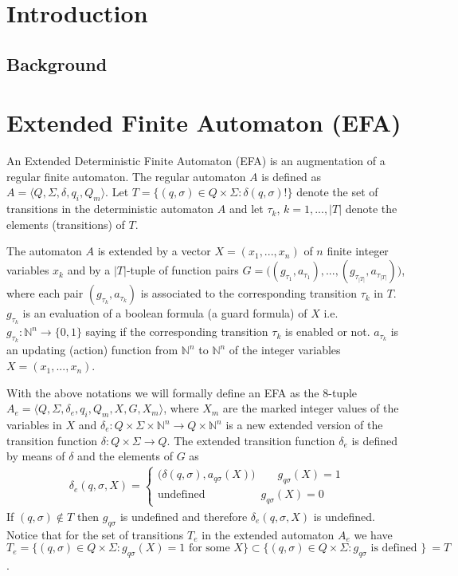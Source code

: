 \documentclass{article}
\begin{document}
\tableofcontents
\section{Introduction}

\subsection{Background}

\section{Extended Finite Automaton (EFA)}
An Extended Deterministic Finite Automaton (EFA) is an
augmentation of a regular finite automaton. The regular automaton
$A$ is defined as $A=\langle Q,\Sigma,\delta, q_i,Q_m \rangle$.
Let $T=\{(q,\sigma)\in Q \times \Sigma: \delta(q,\sigma)!\}$
denote the set of transitions in the deterministic automaton $A$
and let $\tau_k$, $k=1,...,|T|$ denote the elements (transitions)
of $T$.

The automaton $A$ is extended by a vector $X=(x_1,...,x_n)$ of $n$
finite integer variables $x_{k}$ and by a $|T|$-tuple of function
pairs $G=\big((g_{\tau_1},a_{\tau_1}),...,
(g_{\tau_{|T|}},a_{\tau_{|T|}})\big)$, where each pair
$(g_{\tau_k},a_{\tau_k})$ is associated to the corresponding
transition $\tau_k$ in $T$. $g_{\tau_k}$ is an evaluation of a
boolean formula (a guard formula) of $X$ i.e.
$g_{\tau_k}:{\mathbb{N}}^{n}\rightarrow \{0,1\}$ saying if the
corresponding transition $\tau_k$ is enabled or not. $a_{\tau_k}$
is an updating (action) function from ${\mathbb{N}}^{n}$ to
${\mathbb{N}}^{n}$ of the integer variables $X=(x_1,...,x_n)$.

With the above notations we will formally define an EFA as the
$8$-tuple $A_{e}=\langle Q, \Sigma, \delta_{e}, q_i, Q_m, X, G
,X_m \rangle$, where $X_m$ are the marked integer values of the
variables in $X$ and $\delta_{e}: Q \times \Sigma \times
{\mathbb{N}}^{n} \rightarrow Q\times {\mathbb{N}}^{n} $ is a new
extended version of the transition function $\delta:Q \times
\Sigma \rightarrow Q$. The extended transition function $\delta_e$
is defined by means of $\delta$ and the elements of $G$ as
\begin{eqnarray}
\delta_{e}(q,\sigma,X)=\left\{
\begin{array}{ll}
(\delta(q,\sigma),a_{q \sigma}(X)\big)\quad\quad g_{q \sigma}(X)=1\\
\textrm{undefined} \quad\quad\quad\quad\quad g_{q \sigma}(X)=0
\end{array}\right.
\end{eqnarray}
If $(q,\sigma)\notin T$ then $g_{q\sigma}$ is undefined and
therefore $\delta_{e}(q,\sigma,X)$ is undefined. Notice that for
the set of transitions $T_e$ in the extended automaton $A_e$ we
have $T_e=\{(q,\sigma)\in Q \times \Sigma: g_{q\sigma}(X)=1
\textrm{ for some } X\}\subset \{(q,\sigma)\in Q \times \Sigma:
g_{q\sigma} \textrm{ is defined } \}\ =T$.
\end{document}
